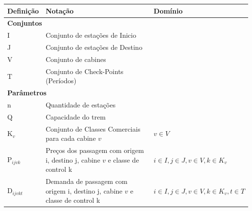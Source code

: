 \begin{table}[h]
	\centering
	\small
	\begin{tabular}{p{2cm} p{9.5cm} p{3.2cm}}
		\toprule
		\textbf{Definição} & \textbf{Notação}                                                                                   & \textbf{Domínio}                                \\ \midrule
		\multicolumn{3}{l}{\textbf{Conjuntos}}                                                                                                                                    \\ \midrule
		I                  & Conjunto de estações de Inicio                                                                     &                                                 \\
		J                  & Conjunto de estações de Destino                                                                    &                                                 \\
		V                  & Conjunto de cabines                                                                                &                                                 \\
		T                  & Conjunto de Check-Points (Períodos)                                                                &                                                 \\ \midrule
		\multicolumn{3}{l}{\textbf{Parâmetros}}                                                                                                                                   \\ \midrule
		n                  & Quantidade de estações                                                                             &                                                 \\
		Q                  & Capacidade do trem                                                                                 &                                                 \\
		K$_{v}$            & Conjunto de Classes Comerciais para cada cabine $v$                                                & $v \in V$                                       \\
		P$_{ijvk}$         & Preços  dos passagem com origem i, destino j, cabine $v$ e classe de control k                     & $i \in I, j \in J, v \in V, k \in K_v$          \\
		D$_{ijvkt}$        & Demanda  de passagem com origem i, destino j, cabine $v$ e classe de control k                     & $i \in I, j \in J, v \in V, k \in K_v, t \in T$ \\ \midrule

\end{tabular}
\end{table}
